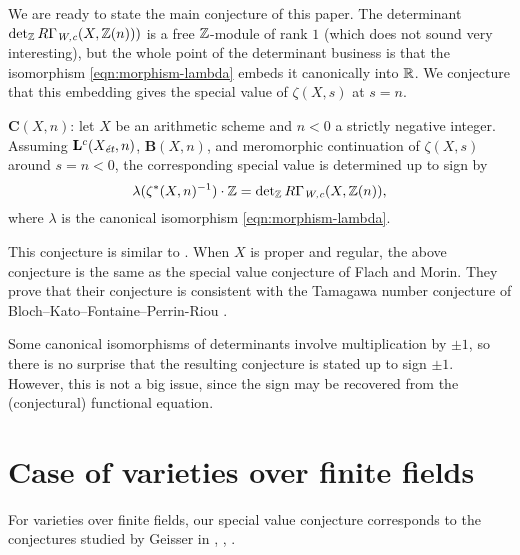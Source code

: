 \documentclass{article}
\numberwithin{equation}{section}
\begin{document}
We are ready to state the main conjecture of this paper. The determinant
$\det_\ZZ R\Gamma_\Wc (X, \ZZ (n)))$ is a free $\ZZ$-module of rank $1$ (which
does not sound very interesting), but the whole point of the determinant
business is that the isomorphism \eqref{eqn:morphism-lambda} embeds it
canonically into $\RR$. We conjecture that this embedding gives the special
value of $\zeta (X,s)$ at $s = n$.

\begin{conjecture}
  $\mathbf{C} (X,n)$: let $X$ be an arithmetic scheme and $n < 0$ a strictly
  negative integer. Assuming $\mathbf{L}^c (X_\et, n)$, $\mathbf{B} (X,n)$, and
  meromorphic continuation of $\zeta (X,s)$ around $s = n < 0$, the
  corresponding special value is determined up to sign by
  \[ \lambda (\zeta^* (X,n)^{-1}) \cdot \ZZ =
    \det_\ZZ R\Gamma_\Wc (X, \ZZ (n)), \]
  where $\lambda$ is the canonical isomorphism \eqref{eqn:morphism-lambda}.
\end{conjecture}

\begin{remark}
  This conjecture is similar to \cite[Conjecture 5.11]{Flach-Morin-2018}.
  When $X$ is proper and regular, the above conjecture is the same as the
  special value conjecture of Flach and Morin. They prove that their conjecture
  is consistent with the Tamagawa number conjecture of
  Bloch--Kato--Fontaine--Perrin-Riou \cite{Fontaine-Perrin-Riou-1994}.
\end{remark}

\begin{remark}
  Some canonical isomorphisms of determinants involve multiplication by $\pm 1$,
  so there is no surprise that the resulting conjecture is stated up to sign
  $\pm 1$. However, this is not a big issue, since the sign may be recovered
  from the (conjectural) functional equation.
\end{remark}


\section{Case of varieties over finite fields}
\label{sec:finite-fields}

For varieties over finite fields, our special value conjecture corresponds to
the conjectures studied by Geisser in \cite{Geisser-2004}, \cite{Geisser-2006},
\cite{Geisser-2010-arithmetic-homology}.
\end{document}
